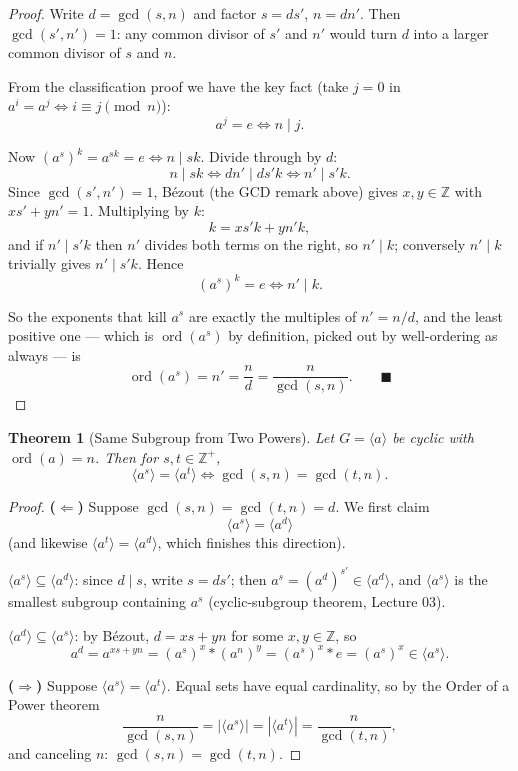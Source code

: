 \documentclass[11pt]{article}
\newcommand{\1}{\mathbf{1}}
\theoremstyle{notestyle}
\newtheorem{theorem}{Theorem}[section]
\theoremstyle{definition}
\begin{document}
\begin{proof}
Write $d = \gcd(s, n)$ and factor $s = d s'$, $n = d n'$. Then
$\gcd(s', n') = 1$: any common divisor of $s'$ and $n'$ would turn $d$ into a
larger common divisor of $s$ and $n$.
\par From the classification proof we have the key fact (take $j = 0$ in
$a^{i} = a^{j} \iff i \equiv j \pmod n$):
$$a^{j} = e \iff n \mid j.$$
\par Now $(a^{s})^{k} = a^{sk} = e \iff n \mid sk$. Divide through by $d$:
$$n \mid sk \iff d n' \mid d s' k \iff n' \mid s' k.$$
Since $\gcd(s', n') = 1$, Bézout (the GCD remark above) gives $x, y \in
\mathbb{Z}$ with $x s' + y n' = 1$. Multiplying by $k$:
$$k = x s' k + y n' k,$$
and if $n' \mid s' k$ then $n'$ divides both terms on the right, so
$n' \mid k$; conversely $n' \mid k$ trivially gives $n' \mid s' k$. Hence
$$(a^{s})^{k} = e \iff n' \mid k.$$
\par So the exponents that kill $a^{s}$ are exactly the multiples of
$n' = n/d$, and the least positive one — which is $\operatorname{ord}(a^{s})$
by definition, picked out by well-ordering as always — is
$$\operatorname{ord}(a^{s}) = n' = \frac{n}{d} = \frac{n}{\gcd(s, n)}.
\qquad \blacksquare$$
\end{proof}
\begin{theorem}[Same Subgroup from Two Powers]
\label{thm:same-subgroup}
Let $G = \langle a \rangle$ be cyclic with $\operatorname{ord}(a) = n$. Then
for $s, t \in \mathbb{Z}^{+}$,
$$\langle a^{s} \rangle = \langle a^{t} \rangle \iff
\gcd(s, n) = \gcd(t, n).$$
\end{theorem}
\begin{proof}
\textbf{($\Leftarrow$)} Suppose $\gcd(s, n) = \gcd(t, n) = d$. We first claim
$$\langle a^{s} \rangle = \langle a^{d} \rangle$$
(and likewise $\langle a^{t} \rangle = \langle a^{d} \rangle$, which finishes
this direction).
\par $\langle a^{s} \rangle \subseteq \langle a^{d} \rangle$: since
$d \mid s$, write $s = d s'$; then $a^{s} = (a^{d})^{s'} \in \langle a^{d}
\rangle$, and $\langle a^{s} \rangle$ is the smallest subgroup containing
$a^{s}$ (cyclic-subgroup theorem, Lecture 03).
\par $\langle a^{d} \rangle \subseteq \langle a^{s} \rangle$: by Bézout,
$d = x s + y n$ for some $x, y \in \mathbb{Z}$, so
$$a^{d} = a^{xs + yn} = (a^{s})^{x} * (a^{n})^{y} = (a^{s})^{x} * e
= (a^{s})^{x} \in \langle a^{s} \rangle.$$
\par \textbf{($\Rightarrow$)} Suppose $\langle a^{s} \rangle = \langle a^{t}
\rangle$. Equal sets have equal cardinality, so by the Order of a Power
theorem
$$\frac{n}{\gcd(s, n)} = \left|\langle a^{s} \rangle\right| =
\left|\langle a^{t} \rangle\right| = \frac{n}{\gcd(t, n)},$$
and canceling $n$: $\gcd(s, n) = \gcd(t, n)$.
\end{proof}
\end{document}
